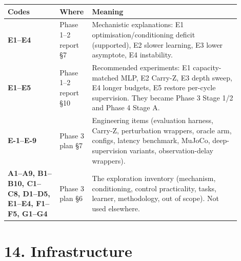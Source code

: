 \documentclass[11pt]{article}
\begin{document}
\begin{center}\small\begin{tabular}{>{\raggedright\arraybackslash}p{0.212\linewidth}>{\raggedright\arraybackslash}p{0.088\linewidth}>{\raggedright\arraybackslash}p{0.605\linewidth}}
\toprule
Codes & Where & Meaning \\
\midrule
\textbf{E1--E4} & Phase 1--2 report \S{}7 & Mechanistic explanations: E1 optimisation/conditioning deficit (supported), E2 slower learning, E3 lower asymptote, E4 instability. \\
\textbf{E1--E5} & Phase 1--2 report \S{}10 & Recommended experiments: E1 capacity-matched MLP, E2 Carry-Z, E3 depth sweep, E4 longer budgets, E5 restore per-cycle supervision. They became Phase 3 Stage 1/2 and Phase 4 Stage A. \\
\textbf{E-1--E-9} & Phase 3 plan \S{}7 & Engineering items (evaluation harness, Carry-Z, perturbation wrappers, oracle arm, configs, latency benchmark, MuJoCo, deep-supervision variants, observation-delay wrappers). \\
\textbf{A1--A9, B1--B10, C1--C8, D1--D5, E1--E4, F1--F5, G1--G4} & Phase 3 plan \S{}6 & The exploration inventory (mechanism, conditioning, control practicality, tasks, learner, methodology, out of scope). Not used elsewhere. \\
\bottomrule
\end{tabular}\end{center}



\section*{14. Infrastructure}
\end{document}
